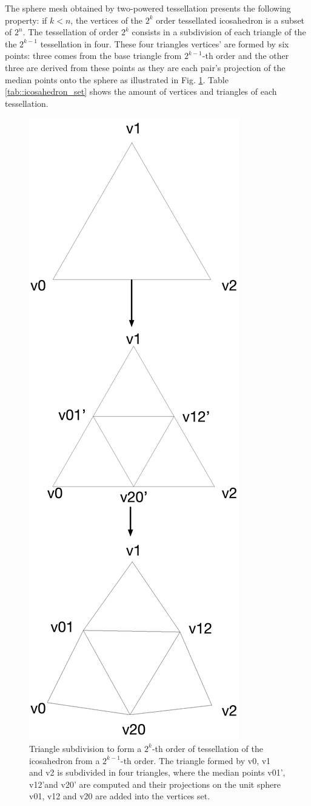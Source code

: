 \documentclass[twoside,twocolumn,10pt]{article}
\begin{document}
The sphere mesh obtained by two-powered tessellation presents the following property:  if $k < n$, the vertices of the $2^{k}$ order tessellated icosahedron is a subset of $2^{n}$. The tessellation of order $2^k$ consists in a subdivision of each triangle of the the $2^{k-1}$ tessellation in four. These four triangles vertices' are formed by six points: three comes from the base triangle from $2^{k-1}$-th order and the other three are derived from these points as they are each pair's projection of the median points onto the sphere as illustrated in Fig. \ref{fig::subdivision_icosahedron}. Table \ref{tab::icosahedron_set} shows the amount of vertices and triangles of each tessellation.

\begin{figure}[ht]
    \centering
    \includegraphics[width=.50\linewidth, angle=0]{figs/icosahedron_example/ico_subdivision_V.png}
    \caption{Triangle subdivision to form a $2^k$-th order of tessellation of the icosahedron from a $2^{k-1}$-th order. The triangle formed by v0, v1 and v2 is subdivided in four triangles, where the median points v01', v12'and v20' are computed and their projections on the unit sphere v01, v12 and v20 are added into the vertices set.
    }
    \label{fig::subdivision_icosahedron}
\end{figure}
\end{document}

